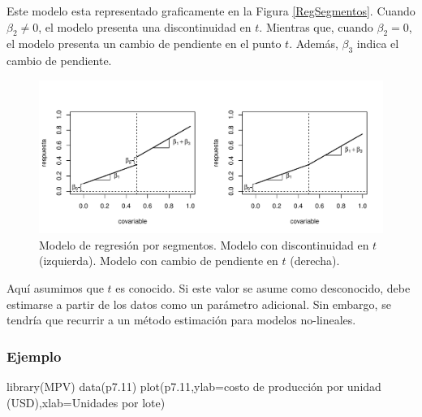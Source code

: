 \documentclass[
]{article}
\newenvironment{Shaded}{\begin{snugshade}}{\end{snugshade}}
\newcommand{\AttributeTok}[1]{\textcolor[rgb]{0.77,0.63,0.00}{#1}}
\newcommand{\FloatTok}[1]{\textcolor[rgb]{0.00,0.00,0.81}{#1}}
\newcommand{\FunctionTok}[1]{\textcolor[rgb]{0.00,0.00,0.00}{#1}}
\newcommand{\NormalTok}[1]{#1}
\newcommand{\StringTok}[1]{\textcolor[rgb]{0.31,0.60,0.02}{#1}}
\begin{document}
Este modelo esta representado graficamente en la Figura \ref{RegSegmentos}. Cuando \(\beta_2 \neq 0\), el modelo presenta una discontinuidad en \(t\). Mientras que, cuando \(\beta_2 = 0\), el modelo presenta un cambio de pendiente en el punto \(t\). Además, \(\beta_3\) indica el cambio de pendiente.

\begin{figure}

{\centering \includegraphics{MLG2_files/figure-latex/RegSegmentos-1} 

}

\caption{Modelo de regresión por segmentos. Modelo con discontinuidad en $t$ (izquierda). Modelo con cambio de pendiente en $t$ (derecha).}\label{fig:RegSegmentos}
\end{figure}

Aquí asumimos que \(t\) es conocido. Si este valor se asume como desconocido, debe estimarse a partir de los datos como un parámetro adicional. Sin embargo, se tendría que recurrir a un método estimación para modelos no-lineales.

\hypertarget{ejemplo}{%
\subsubsection{Ejemplo}\label{ejemplo}}

\begin{Shaded}
\begin{Highlighting}[]
\FunctionTok{library}\NormalTok{(MPV)}
\FunctionTok{data}\NormalTok{(p7}\FloatTok{.11}\NormalTok{)}
\FunctionTok{plot}\NormalTok{(p7}\FloatTok{.11}\NormalTok{,}\AttributeTok{ylab=}\StringTok{\textquotesingle{}costo de producción por unidad (USD)\textquotesingle{}}\NormalTok{,}\AttributeTok{xlab=}\StringTok{\textquotesingle{}Unidades por lote\textquotesingle{}}\NormalTok{)}
\end{Highlighting}
\end{Shaded}
\end{document}
